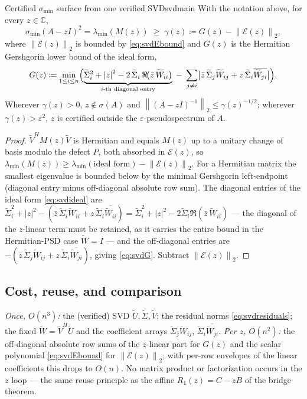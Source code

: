 \documentclass[11pt, a4paper]{article}
\numberwithin{equation}{section}
\newcommand{\norm}[1]{\left\|#1\right\|}
\newcommand{\abs}[1]{\left|#1\right|}
\newcommand{\tU}{\widetilde{U}}
\newcommand{\tV}{\widetilde{V}}
\newcommand{\tSig}{\widetilde{\Sigma}}
\newcommand{\tW}{\widetilde{W}}
\newcommand{\C}{\mathbb{C}}
\begin{document}
\begin{theorem}{Certified $\sigma_{\min}$ surface from one verified SVD}{svdmain}
  With the notation above, for every $z \in \C$,
  \[
    \sigma_{\min}(A - zI)^2 = \lambda_{\min}(M(z))
      \;\ge\; \gamma(z) \coloneqq G(z) - \norm{\mathcal{E}(z)}_2,
  \]
  where $\norm{\mathcal{E}(z)}_2$ is bounded by \eqref{eq:svdEbound} and $G(z)$ is
  the Hermitian Gershgorin lower bound of the ideal form,
  \begin{equation}\label{eq:svdG}
    G(z) \coloneqq \min_{1\le i\le n}\Bigl(
      \underbrace{\tSig_i^2 + \abs{z}^2
        - 2\,\tSig_i\,\Re\!\bigl(\bar z\,\tW_{ii}\bigr)}_{\text{$i$-th diagonal entry}}
      \;-\; \sum_{j\ne i}\bigl|\bar z\,\tSig_j \tW_{ij}
        + z\,\tSig_i\overline{\tW_{ji}}\bigr|
      \Bigr).
  \end{equation}
  Wherever $\gamma(z) > 0$, $z \notin \sigma(A)$ and $\norm{(A - zI)^{-1}}_2 \le
  \gamma(z)^{-1/2}$; wherever $\gamma(z) > \varepsilon^2$, $z$ is certified
  outside the $\varepsilon$-pseudospectrum of $A$.
\end{theorem}

\begin{proof}
$\tV^H M(z)\tV$ is Hermitian and equals $M(z)$ up to a unitary change of basis
modulo the defect $P$, both absorbed in $\mathcal{E}(z)$, so
$\lambda_{\min}(M(z)) \ge \lambda_{\min}(\text{ideal form}) -
\norm{\mathcal{E}(z)}_2$.  For a Hermitian matrix the smallest eigenvalue is
bounded below by the minimal Gershgorin left-endpoint (diagonal entry minus
off-diagonal absolute row sum).  The diagonal entries of the ideal form
\eqref{eq:svdideal} are $\tSig_i^2 + \abs{z}^2 - (\bar z\,\tSig_i\tW_{ii} +
z\,\tSig_i\overline{\tW_{ii}}) = \tSig_i^2 + \abs{z}^2 -
2\tSig_i\Re(\bar z\,\tW_{ii})$ --- the diagonal of the $z$-linear term must be
retained, as it carries the entire bound in the Hermitian-PSD case $\tW = I$ ---
and the off-diagonal entries are $-(\bar z\,\tSig_j\tW_{ij} +
z\,\tSig_i\overline{\tW_{ji}})$, giving \eqref{eq:svdG}.  Subtract
$\norm{\mathcal{E}(z)}_2$.
\end{proof}

\subsection{Cost, reuse, and comparison}

\emph{Once, $O(n^3)$:} the (verified) SVD $\tU,\tSig,\tV$; the residual norms
\eqref{eq:svdresiduals}; the fixed $\tW = \tV^H\tU$ and the coefficient arrays
$\tSig_j\tW_{ij}$, $\tSig_i\overline{\tW_{ji}}$.  \emph{Per $z$, $O(n^2)$:} the
off-diagonal absolute row sums of the $z$-linear part for $G(z)$ and the scalar
polynomial \eqref{eq:svdEbound} for $\norm{\mathcal{E}(z)}_2$; with per-row
envelopes of the linear coefficients this drops to $O(n)$.  No matrix product or
factorization occurs in the $z$ loop --- the same reuse principle as the affine
$R_1(z) = C - zB$ of the bridge theorem.
\end{document}
